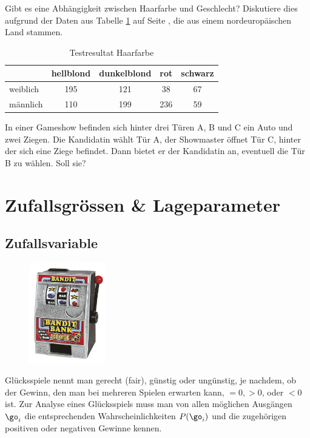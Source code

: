 \documentclass[%
11pt,%
twoside,%
titlepage,%
german,%
headsepline%
]{scrartcl}
\newcommand{\spaltenheight}{\rule{0mm}{3ex}}
\newcommand{\spaltensep}{\\[1ex]}
\begin{document}
\begin{ueb}
Gibt
es eine Abhängigkeit zwischen Haarfarbe und Geschlecht? Diskutiere dies aufgrund der Daten aus Tabelle \ref{Haarfarbe} auf Seite \pageref{Haarfarbe}, die aus einem nordeuropäischen Land stammen.

\begin{table}[h]
\begin{center}
\begin{tabular}{|l|c|c|c|c|}
\hline
\rowcolor{Gray}\spaltenheight & hellblond & dunkelblond & rot & schwarz\spaltensep \hline
\rowcolor{lightyellow}\spaltenheight  weiblich & 195 & 121 & 38 & 67\spaltensep \hline
\rowcolor{Gray}\spaltenheight  männlich & 110 & 199 & 236 & 59\spaltensep \hline
\end{tabular}
\end{center}
\caption{Testresultat Haarfarbe}\label{Haarfarbe}
\end{table}
\end{ueb}

\begin{ueb}[Ziegenproblem]
In
einer Gameshow befinden sich hinter drei Türen A, B und C ein Auto und zwei Ziegen. Die Kandidatin wählt Tür A, der Showmaster öffnet Tür C, hinter der sich eine Ziege befindet. Dann bietet er der Kandidatin an, eventuell die Tür B zu wählen. Soll sie?
\end{ueb}

\clearpage

\section{Zufallsgrössen \& Lageparameter}

\subsection{Zufallsvariable}
\begin{figure}
  \begin{center}
    \includegraphics[width=0.3\textwidth]{pictures/bandit}
  \end{center}
\end{figure}
Glücksspiele nennt man gerecht (fair), günstig oder ungünstig, je nachdem, ob der Gewinn, den man bei mehreren Spielen erwarten kann, $=0, >0$, oder $<0$ ist. Zur Analyse eines Glücksspiels muss man von allen möglichen Ausgängen $\go_i$ die entsprechenden Wahrscheinlichkeiten $P(\go_i)$ und die zugehörigen positiven oder negativen Gewinne kennen.
\end{document}
